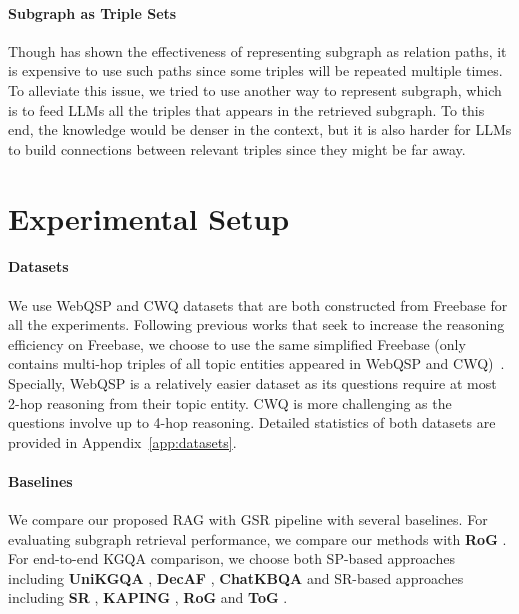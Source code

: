 \documentclass[11pt]{article}
\begin{document}
\paragraph{Subgraph as Triple Sets}
Though \citet{luo2024reasoning} has shown the effectiveness of representing subgraph as relation paths, it is expensive to use such paths since some triples will be repeated multiple times. To alleviate this issue, we tried to use another way to represent subgraph, which is to feed LLMs all the triples that appears in the retrieved subgraph. To this end, the knowledge would be denser in the context, but it is also harder for LLMs to build connections between relevant triples since they might be far away. 

\section{Experimental Setup}

\paragraph{Datasets}
We use WebQSP \citep{yih-etal-2016-value} and CWQ \citep{talmor-berant-2018-web} datasets that are both constructed from Freebase for all the experiments. Following previous works that seek to increase the reasoning efficiency on Freebase, we choose to use the same simplified Freebase (only contains multi-hop triples of all topic entities appeared in WebQSP and CWQ)~\citep{DBLP:conf/wsdm/HeL0ZW21, zhang-etal-2022-subgraph, luo2024reasoning}. Specially, WebQSP is a relatively easier dataset as its questions require at most 2-hop reasoning from their topic entity. CWQ is more challenging as the questions involve up to 4-hop reasoning. Detailed statistics of both datasets are provided in Appendix~\ref{app:datasets}. 

\paragraph{Baselines}
We compare our proposed RAG with GSR pipeline with several baselines. For evaluating subgraph retrieval performance, we compare our methods with \textbf{RoG} \citep{luo2024reasoning}. For end-to-end KGQA comparison, we choose both SP-based approaches including \textbf{UniKGQA} \citep{jiang2023unikgqa}, \textbf{DecAF} \citep{yu2023decaf}, \textbf{ChatKBQA} \citep{luo2023chatkbqa} and SR-based approaches including \textbf{SR} \citep{zhang-etal-2022-subgraph}, \textbf{KAPING} \citep{baek-etal-2023-knowledge}, \textbf{RoG}  \citep{luo2024reasoning} and \textbf{ToG} \citep{sun2024thinkongraph}.
\end{document}

